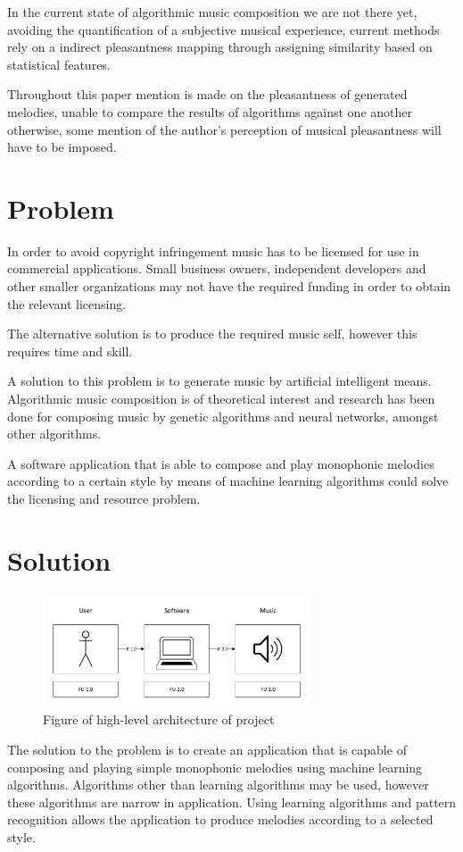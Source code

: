 In the current state of algorithmic music composition we are not there yet, avoiding the quantification of a subjective musical experience, current methods rely on a indirect pleasantness mapping through assigning similarity based on statistical features. 

Throughout this paper mention is made on the pleasantness of generated melodies, unable to compare the results of algorithms against one another otherwise, some mention of the author's perception of musical pleasantness will have to be imposed.

\section{Problem}
In order to avoid copyright infringement music has to be licensed for use in commercial applications. Small business owners, independent developers and other smaller organizations may not have the required funding in order to obtain the relevant licensing.

The alternative solution is to produce the required music self, however this requires time and skill.

A solution to this problem is to generate music by artificial intelligent means. 
Algorithmic music composition is of theoretical interest and research has been done for composing music by genetic algorithms and neural networks, amongst other algorithms.

A software application that is able to compose and play monophonic melodies according to a certain style by means of machine learning algorithms could solve the licensing and resource problem.

\section{Solution}
\begin{figure}
\centerline{\includegraphics[width=300px]{../images/arch.pdf}}
\caption{Figure of high-level architecture of project}
\label{ims:archm}
\end{figure}

The solution to the problem is to create an application that is capable of composing and playing simple monophonic melodies using machine learning algorithms. Algorithms other than learning algorithms may be used, however these algorithms are narrow in application. Using learning algorithms and pattern recognition allows the application to produce melodies according to a selected style.

